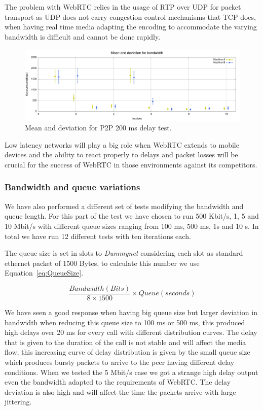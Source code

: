 The problem with WebRTC relies in the usage of RTP over UDP for packet transport as UDP does not carry congestion control mechanisms that TCP does, when having real time media adapting the encoding to accommodate the varying bandwidth is difficult and cannot be done rapidly.

 \begin{figure}[h]
  \centering
    \includegraphics[width=1\textwidth]{./figures/mean_deviation_bw_delay200.pdf}
      \caption[Mean and deviation for P2P 200 ms delay test]{Mean and deviation for P2P 200 ms delay test.}
	\label{fig:mean_deviation_bw_delay200}
\end{figure}

Low latency networks will play a big role when WebRTC extends to mobile devices and the ability to react properly to delays and packet losses will be crucial for the success of WebRTC in those environments against its competitors.

\subsubsection{Bandwidth and queue variations}

We have also performed a different set of tests modifying the bandwidth and queue length. For this part of the test we have chosen to run 500 Kbit/s, 1, 5 and 10 Mbit/s with different queue sizes ranging from 100 ms, 500 ms, 1s and 10 s. In total we have run 12 different tests with ten iterations each.

The queue size is set in slots to {\it Dummynet} considering each slot as standard ethernet packet of 1500 Bytes, to calculate this number we use Equation~\ref{eq:QueueSize}.

\begin{equation}
	\frac{Bandwidth (Bits)}{8 \times 1500} \times Queue (seconds)
	\label{eq:QueueSize}
\end{equation}

We have seen a good response when having big queue size but larger deviation in bandwidth when reducing this queue size to 100 ms or 500 ms, this produced high delays over 20 ms for every call with different distribution curves. The delay that is given to the duration of the call is not stable and will affect the media flow, this increasing curve of delay distribution is given by the small queue size which produces bursty packets to arrive to the peer having different delay conditions.
When we tested the 5 Mbit/s case we got a strange high delay output even the bandwidth adapted to the requirements of WebRTC. The delay deviation is also high and will affect the time the packets arrive with large jittering.